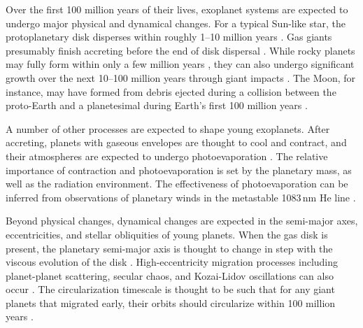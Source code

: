 \documentclass[12pt,twocolumn,tighten]{aastex63}
\begin{document}
Over the first 100 million years of their lives, exoplanet systems are
expected to undergo major physical and dynamical changes.  For a
typical Sun-like star, the protoplanetary disk disperses within
roughly 1--10 million years
\citep{mamajek_initial_2009,dullemond_inner_2010,williams_protoplanetary_2011}.
Gas giants presumably finish accreting before the end of disk
dispersal \citep{pollack_formation_1996}.  While rocky planets may
fully form within only a few million years
\citep{dauphas_hf-w-th_2011}, they can also undergo significant growth
over the next 10--100 million years through giant impacts \citep[{\it
e.g.},][]{kleine_hf-w_2009,konig_earths_2011,morbidelli_building_2012,raymond_terrestrial_2014}.
The Moon, for instance, may have formed from debris ejected during a
collision between the proto-Earth and a planetesimal during Earth's
first 100 million years \citep{cameron_origin_1976,canup_origin_2001}.

A number of other processes are expected to shape young exoplanets.
After accreting, planets with gaseous envelopes are thought to cool
and contract, and their atmospheres are expected to undergo
photoevaporation \citep[{\it
e.g.},][]{Fortney_et_al_2007,Owen_Wu_2013,Fulton_et_al_2017,gupta_sculpting_2019,gupta_signatures_2020}.
The relative importance of contraction and photoevaporation is set by
the planetary mass, as well as the radiation environment.  The
effectiveness of photoevaporation can be inferred from observations of
planetary winds in the metastable 1083$\,$nm He line
\citep{spake_helium_2018,oklopcic_new_2018,mansfield_detection_2018}.

Beyond physical changes, dynamical changes are expected in the
semi-major axes, eccentricities, and stellar obliquities of young
planets.  When the gas disk is present, the planetary semi-major axis
is thought to change in step with the viscous evolution of the disk
\citep{lin_orbital_1996}.  High-eccentricity migration processes
including planet-planet scattering, secular chaos, and Kozai-Lidov
oscillations can also occur \citep[{\it
e.g.},][]{chatterjee_dynamical_2008,lithwick_secular_2014,fabrycky_shrinking_2007}.
The circularization timescale is thought to be such that for any giant
planets that migrated early, their orbits should circularize within
100 million years \citep{zahn_tidal_1977}.
\end{document}
